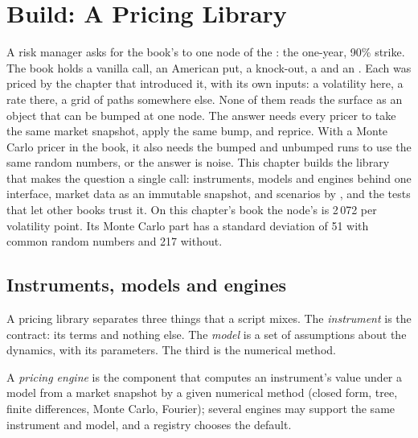 \chapter{Build: A Pricing Library}\label{ch:dv:build-a-pricing-library}

A risk manager asks for the book's  to one node of the : the one-year, 90\% strike. The book holds a vanilla call, an
American put, a knock-out, a  and an . Each was priced by the chapter that introduced it, with its own inputs: a volatility
here, a rate there, a grid of paths somewhere else. None of them reads the surface as an object that can be bumped at one node. The answer needs every
pricer to take the same market snapshot, apply the same bump, and reprice. With a Monte Carlo pricer in the book, it also needs the bumped and unbumped
runs to use the same random numbers, or the answer is noise. This chapter builds the library that makes the question a single call: instruments,
models and engines behind one interface, market data as an immutable snapshot,  and scenarios by , and the tests that let other
books trust it. On this chapter's book the node's  is 2\,072 per volatility point. Its Monte Carlo part has a standard deviation of 51 with common
random numbers and 217 without.

\section{Instruments, models and engines}

A pricing library separates three things that a script mixes. The \emph{instrument} is the contract: its terms and nothing else. The \emph{model} is a
set of assumptions about the dynamics, with its parameters. The third is the numerical method.

\begin{definition}\label{def:dv:build-a-pricing-library:engine}
A \emph{pricing engine} is the component that computes an instrument's value under a model from a market snapshot by a given
numerical method (closed form, tree, finite differences, Monte Carlo, Fourier); several engines may support the same instrument and model, and a
registry chooses the default.
\end{definition}

